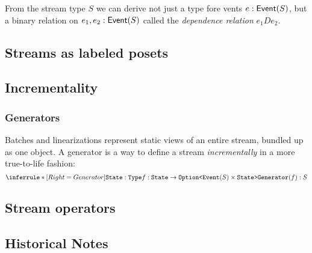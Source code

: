 From the stream type $S$ we can derive not just a type fore vents
$e: \mathsf{Event}({S})$, but a binary relation on $e_1, e_2: \mathsf{Event}({S})$
called the \emph{dependence relation} $e_1 D e_2$.

\subsection{Streams as labeled posets}

\subsection{Incrementality}

\subsubsection{Generators}

Batches and linearizations represent static views of an entire stream, bundled up as one object. A generator is a way to define a stream \emph{incrementally} in a more true-to-life fashion:
\[
\inference[Generator]
{
  \texttt{State}: \texttt{Type} \\
  f: \texttt{State} \to \texttt{Option<}\texttt{Event}(S) \times \texttt{State>}
}
{
  \texttt{Generator}(f): S
}
\]

\subsection{Stream operators}

\subsection{Historical Notes}
